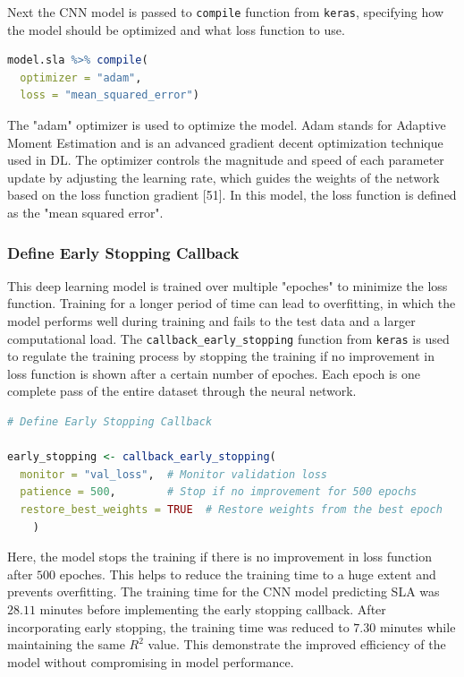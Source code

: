 \documentclass[12pt,a4paper]{report}
\begin{document}
Next the CNN model is passed to \texttt{compile} function from \texttt{keras}, specifying how the model should be optimized and what loss function to use. \\

\begin{lstlisting}[language=R, style=mystyle]
model.sla %>% compile(
  optimizer = "adam",
  loss = "mean_squared_error")
\end{lstlisting}

The "adam" optimizer is used to optimize the model. Adam stands for Adaptive Moment Estimation and is an advanced gradient decent optimization technique used in DL. The optimizer controls the magnitude and speed of each parameter update by adjusting the learning rate, which guides the weights of the network based on the loss function gradient [51]. In this model, the loss function is defined as the "mean squared error". \\

\subsubsection*{Define Early Stopping Callback}
This deep learning model is trained over multiple "epoches" to minimize the loss function. Training for a longer period of time can lead to overfitting, in which the model performs well during training and fails to the test data and a larger computational load. The \texttt{callback\_early\_stopping} function from \texttt{keras} is used to regulate the training process by stopping the training if no improvement in loss function is shown after a certain number of epoches. Each epoch is one complete pass of the entire dataset through the neural network. \\

\begin{lstlisting}[language=R, style=mystyle]
# Define Early Stopping Callback

early_stopping <- callback_early_stopping(
  monitor = "val_loss",  # Monitor validation loss
  patience = 500,        # Stop if no improvement for 500 epochs 
  restore_best_weights = TRUE  # Restore weights from the best epoch
    )
\end{lstlisting}

Here, the model stops the training if there is no improvement in loss function after $500$ epoches. This helps to reduce the training time to a huge extent and prevents overfitting. The training time for the CNN model predicting SLA was $28.11$ minutes before implementing the early stopping callback. After incorporating early stopping, the training time was reduced to $7.30$ minutes while maintaining the same $R^2$ value. This demonstrate the improved efficiency of the model without compromising in model performance. \\
\end{document}
